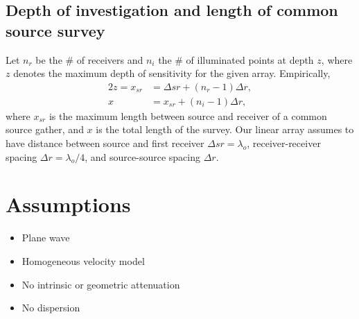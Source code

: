 \documentclass[a4paper,12pt]{article}
\begin{document}
\subsection{Depth of investigation and length of common source survey}
Let $n_r$ be the \# of receivers and $n_i$ the \# of illuminated points at depth $z$, where $z$ denotes the maximum depth of sensitivity for the given array. Empirically,
\begin{equation}
\begin{aligned}
2z=x_{sr} &= \Delta sr + (n_r - 1)\Delta r,\\
x &=  x_{sr} + (n_i - 1)\Delta r,
\end{aligned}
\end{equation}
where $x_{sr}$ is the maximum length between source and receiver of a common source gather, and $x$ is the total length of the survey. Our linear array assumes to have distance between source and first receiver $\Delta sr=\lambda_o$, receiver-receiver spacing $\Delta r=\lambda_o/4$, and source-source spacing $\Delta r$.
%
\section{Assumptions}
\begin{itemize}
\item Plane wave
\item Homogeneous velocity model
\item No intrinsic or geometric attenuation
\item No dispersion
\end{itemize}
%
%

%
%
\end{document}
